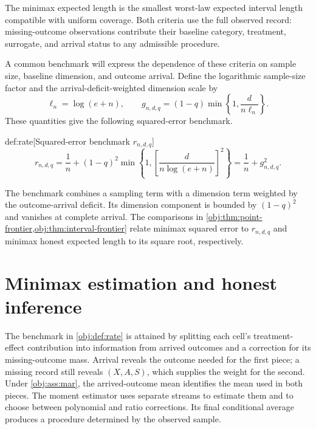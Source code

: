 \documentclass[11pt]{article}
\begin{document}
The minimax expected length  is the smallest worst-law expected interval length compatible with uniform coverage. Both criteria use the full observed record: missing-outcome observations contribute their baseline category, treatment, surrogate, and arrival status to any admissible procedure.

A common benchmark will express the dependence of these criteria on sample size, baseline dimension, and outcome arrival. Define the logarithmic sample-size factor  and the arrival-deficit-weighted dimension scale  by
\[
\ell_n=\log(e+n),
\qquad
g_{n,d,q}=(1-q)\min\left\{1,\frac{d}{n\ell_n}\right\}.
\]
These quantities give the following squared-error benchmark.

\begin{definitionv}{def:rate}[Squared-error benchmark \(r_{n,d,q}\)]
\[
r_{n,d,q}
=
\frac{1}{n}
+
(1-q)^2
\min\left\{
1,
\left[\frac{d}{n\log(e+n)}\right]^2
\right\}
=
\frac{1}{n}+g_{n,d,q}^2.
\]
\end{definitionv}

The benchmark  combines a sampling term with a dimension term weighted by the outcome-arrival deficit. Its dimension component is bounded by \((1-q)^2\) and vanishes at complete arrival. The comparisons in \cref{obj:thm:point-frontier,obj:thm:interval-frontier} relate minimax squared error to \(r_{n,d,q}\) and minimax honest expected length to its square root, respectively.


\section{Minimax estimation and honest inference}

The benchmark in \cref{obj:def:rate} is attained by splitting each cell's treatment-effect contribution into information from arrived outcomes and a correction for its missing-outcome mass. Arrival reveals the outcome needed for the first piece; a missing record still reveals \((X,A,S)\), which supplies the weight for the second. Under \cref{obj:ass:mar}, the arrived-outcome mean identifies the mean used in both pieces. The moment estimator  uses separate streams to estimate them and to choose between polynomial and ratio corrections. Its final conditional average produces a procedure determined by the observed sample.
\end{document}
